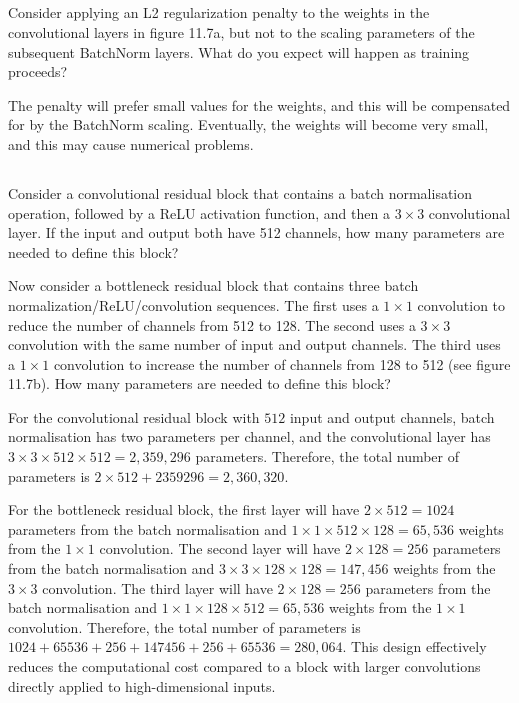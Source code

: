 \documentclass[12pt]{report}
\begin{document}
\subsection{}
\begin{mdframed}
    Consider applying an L2 regularization penalty to the weights in the convolutional layers in figure 11.7a, but not to the scaling parameters of the subsequent BatchNorm layers. What do you expect will happen as training proceeds?
\end{mdframed}


The penalty will prefer small values for the weights, and this will be compensated for by the BatchNorm scaling. Eventually, the weights will become very small, and this may cause numerical problems.

\subsection{}
\begin{mdframed}
    Consider a convolutional residual block that contains a batch normalisation operation, followed by a ReLU activation function, and then a $3 \times 3$ convolutional layer. If the input and output both have 512 channels, how many parameters are needed to define this block?

    Now consider a bottleneck residual block that contains three batch normalization/ReLU/convolution sequences. The first uses a $1\times 1$ convolution to reduce the number of channels from 512 to 128. The second uses a $3 \times 3$ convolution with the same number of input and output channels. The third uses a $1\times 1$ convolution to increase the number of channels from 128 to 512 (see figure 11.7b). How many parameters are needed to define this block?
\end{mdframed}

For the convolutional residual block with $512$ input and output channels, batch normalisation has two parameters per channel, and the convolutional layer has $3 \times 3 \times 512 \times 512 = 2,359,296$ parameters. Therefore, the total number of parameters is $2 \times 512 + 2359296 = 2,360,320$.

For the bottleneck residual block, the first layer will have $2 \times 512 = 1024$ parameters from the batch normalisation and $1 \times 1 \times 512 \times 128 = 65,536$ weights from the $1\times 1$ convolution. The second layer will have $2 \times 128 = 256$ parameters from the batch normalisation and $3 \times 3 \times 128 \times 128 = 147,456$ weights from the $3\times 3$ convolution. The third layer will have $2 \times 128 = 256$ parameters from the batch normalisation and $1 \times 1 \times 128 \times 512 = 65,536$ weights from the $1\times 1$ convolution. Therefore, the total number of parameters is $1024 + 65536 + 256 + 147456 + 256 + 65536 = 280,064$. This design effectively reduces the computational cost compared to a block with larger convolutions directly applied to high-dimensional inputs.
\end{document}
